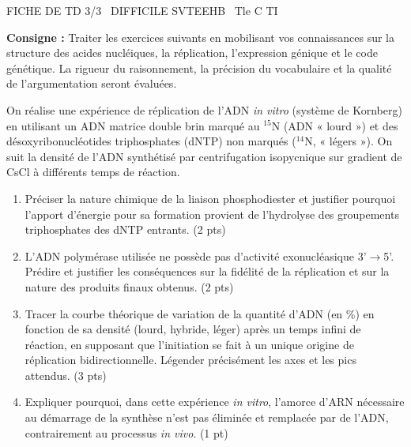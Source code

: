\documentclass[11pt]{article}
\begin{document}
\begin{tcolorbox}[enhanced,colback=popink,colframe=popink,arc=10pt,boxrule=0pt,left=12pt,right=12pt,top=9pt,bottom=9pt]
{\color{white}\popxbold\small FICHE DE TD 3/3 \textbullet\ DIFFICILE \hfill SVTEEHB \textbullet\ Tle C TI\par}
\end{tcolorbox}
\vspace{4pt}
\noindent \textbf{Consigne :} Traiter les exercices suivants en mobilisant vos connaissances sur la structure des acides nucléiques, la réplication, l'expression génique et le code génétique. La rigueur du raisonnement, la précision du vocabulaire et la qualité de l'argumentation seront évaluées.

\begin{exercice}
On réalise une expérience de réplication de l'ADN \textit{in vitro} (système de Kornberg) en utilisant un ADN matrice double brin marqué au $^{15}$N (ADN « lourd ») et des désoxyribonucléotides triphosphates (dNTP) non marqués ($^{14}$N, « légers »). On suit la densité de l'ADN synthétisé par centrifugation isopycnique sur gradient de CsCl à différents temps de réaction.

\begin{enumerate}
    \item Préciser la nature chimique de la liaison phosphodiester et justifier pourquoi l'apport d'énergie pour sa formation provient de l'hydrolyse des groupements triphosphates des dNTP entrants. (2 pts)
    \item L'ADN polymérase utilisée ne possède pas d'activité exonucléasique 3'$\rightarrow$5'. Prédire et justifier les conséquences sur la fidélité de la réplication et sur la nature des produits finaux obtenus. (2 pts)
    \item Tracer la courbe théorique de variation de la quantité d'ADN (en \%) en fonction de sa densité (lourd, hybride, léger) après un temps infini de réaction, en supposant que l'initiation se fait à un unique origine de réplication bidirectionnelle. Légender précisément les axes et les pics attendus. (3 pts)
    \item Expliquer pourquoi, dans cette expérience \textit{in vitro}, l'amorce d'ARN nécessaire au démarrage de la synthèse n'est pas éliminée et remplacée par de l'ADN, contrairement au processus \textit{in vivo}. (1 pt)
\end{enumerate}
\end{exercice}
\end{document}
